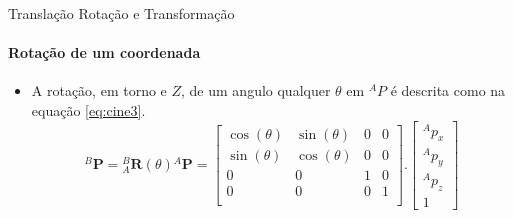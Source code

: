\documentclass{beamer}
\begin{document}
\begin{frame}{{Translação Rotação e Transformação}}
    \framesubtitle{Rotação de um coordenada}
    \begin{itemize}
        \item A rotação, em torno e $Z $, de um angulo qualquer $\theta$ em ${}^AP$ é descrita como na equação \eqref{eq:cine3}. 
        \begin{equation}\label{eq:cine3}
            {}^B\mathbf{P} = {}_A^B \mathbf{R}(\theta) {}^A\mathbf{P} = 
            \begin{bmatrix}
            \cos(\theta) & \sin(\theta) & 0 & 0\\
            \sin(\theta) & \cos(\theta) & 0 & 0\\
            0 & 0 & 1 & 0\\ 
            0 & 0 & 0 & 1\\
            \end{bmatrix}.
            \begin{bmatrix}
            {}^Ap_x\\
            {}^Ap_y\\
            {}^Ap_z\\
            1
            \end{bmatrix}
            \end{equation}
    \end{itemize}
\end{frame}
\end{document}
